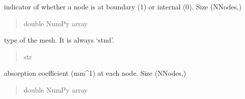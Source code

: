 \documentclass[letterpaper,10pt,english]{sphinxmanual}
\begin{document}
\begin{fulllineitems}
\begin{fulllineitems}
\label{\detokenize{_autosummary/nirfasterff.base.stnd_mesh.stndmesh:nirfasterff.base.stnd_mesh.stndmesh.bndvtx}}
\pysigstartsignatures
{}
\pysigstopsignatures
\sphinxAtStartPar
indicator of whether a node is at boundary (1) or internal (0). Size (NNodes,)
\begin{quote}\begin{description}
\sphinxAtStartPar
double NumPy array

\end{description}\end{quote}

\end{fulllineitems}


\begin{fulllineitems}
\label{\detokenize{_autosummary/nirfasterff.base.stnd_mesh.stndmesh:nirfasterff.base.stnd_mesh.stndmesh.type}}
\pysigstartsignatures
{}
\pysigstopsignatures
\sphinxAtStartPar
type of the mesh. It is always ‘stnd’.
\begin{quote}\begin{description}
\sphinxAtStartPar
str

\end{description}\end{quote}

\end{fulllineitems}


\begin{fulllineitems}
\label{\detokenize{_autosummary/nirfasterff.base.stnd_mesh.stndmesh:nirfasterff.base.stnd_mesh.stndmesh.mua}}
\pysigstartsignatures
{}
\pysigstopsignatures
\sphinxAtStartPar
absorption coefficient (mm\textasciicircum{}\sphinxhyphen{}1) at each node. Size (NNodes,)
\begin{quote}\begin{description}
\sphinxAtStartPar
double NumPy array

\end{description}\end{quote}


\end{fulllineitems}
\end{fulllineitems}
\end{document}
